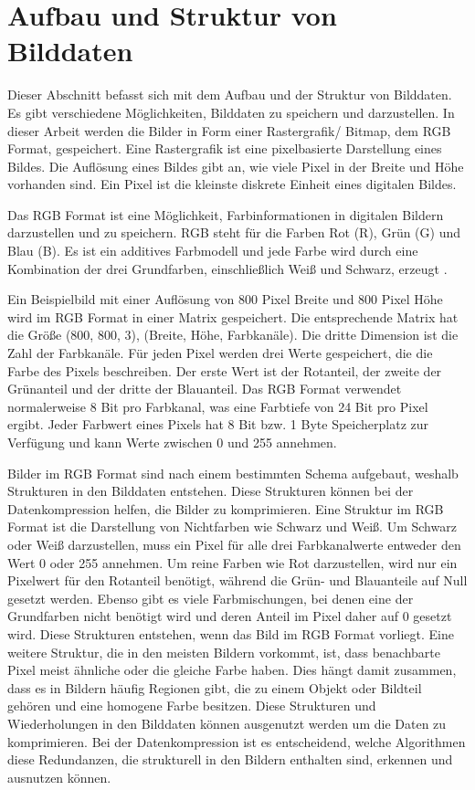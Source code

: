 \documentclass[conference]{IEEEtran}
\begin{document}
\section{Aufbau und Struktur von Bilddaten}

Dieser Abschnitt befasst sich mit dem Aufbau und der Struktur von Bilddaten. 
Es gibt verschiedene Möglichkeiten, Bilddaten zu speichern und darzustellen. 
In dieser Arbeit werden die Bilder in Form einer Rastergrafik/ Bitmap, dem RGB Format, 
gespeichert. 
Eine Rastergrafik ist eine pixelbasierte Darstellung eines Bildes. 
Die Auflösung eines Bildes gibt an, wie viele Pixel in der Breite und Höhe vorhanden sind. 
Ein Pixel ist die kleinste diskrete Einheit eines digitalen Bildes. 

Das RGB Format ist eine Möglichkeit, Farbinformationen in digitalen Bildern darzustellen 
und zu speichern. 
RGB steht für die Farben Rot (R), Grün (G) und Blau (B). 
Es ist ein additives Farbmodell und jede Farbe wird durch eine Kombination der drei 
Grundfarben, einschließlich Weiß und Schwarz, erzeugt \cite{rite}.

Ein Beispielbild mit einer Auflösung von 800 Pixel Breite und 800 Pixel Höhe wird 
im RGB Format in einer Matrix gespeichert. 
Die entsprechende Matrix hat die Größe (800, 800, 3), (Breite, Höhe, Farbkanäle). 
Die dritte Dimension ist die Zahl der Farbkanäle. 
Für jeden Pixel werden drei Werte gespeichert, die die Farbe des Pixels beschreiben. 
Der erste Wert ist der Rotanteil, der zweite der Grünanteil und der dritte der Blauanteil. 
Das RGB Format verwendet normalerweise 8 Bit pro Farbkanal, was eine Farbtiefe von 24 Bit 
pro Pixel ergibt. 
Jeder Farbwert eines Pixels hat 8 Bit bzw. 1 Byte Speicherplatz zur Verfügung und 
kann Werte zwischen 0 und 255 annehmen.

Bilder im RGB Format sind nach einem bestimmten Schema aufgebaut, weshalb
Strukturen in den Bilddaten entstehen.
Diese Strukturen können bei der Datenkompression helfen, die Bilder zu komprimieren.
Eine Struktur im RGB Format ist die Darstellung von Nichtfarben
wie Schwarz und Weiß.
Um Schwarz oder Weiß darzustellen, muss ein Pixel für alle drei Farbkanalwerte entweder 
den Wert 0 oder 255 annehmen. 
Um reine Farben wie Rot darzustellen, wird nur ein Pixelwert für den Rotanteil 
benötigt, während die Grün- und Blauanteile auf Null gesetzt werden. 
Ebenso gibt es viele Farbmischungen, bei denen eine der Grundfarben nicht benötigt 
wird und deren Anteil im Pixel daher auf 0 gesetzt wird. 
Diese Strukturen entstehen, wenn das Bild im RGB Format vorliegt. 
Eine weitere Struktur, die in den meisten Bildern vorkommt, ist, dass benachbarte 
Pixel meist ähnliche oder die gleiche Farbe haben. 
Dies hängt damit zusammen, dass es in Bildern häufig Regionen gibt, die zu einem 
Objekt oder Bildteil gehören und eine homogene Farbe besitzen.
Diese Strukturen und Wiederholungen in den Bilddaten können ausgenutzt werden um die
Daten zu komprimieren.
Bei der Datenkompression ist es entscheidend, welche Algorithmen diese Redundanzen, 
die strukturell in den Bildern enthalten sind, erkennen und ausnutzen können.
\end{document}
